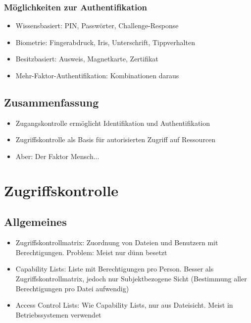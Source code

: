 \subsubsection{Möglichkeiten zur Authentifikation}
\begin{itemize}
	\item Wissensbasiert: PIN, Passwörter, Challenge-Response
	\item Biometrie: Fingerabdruck, Iris, Unterschrift, Tippverhalten
	\item Besitzbasiert: Ausweis, Magnetkarte, Zertifikat
	\item Mehr-Faktor-Authentifikation: Kombinationen daraus
\end{itemize}


\subsection{Zusammenfassung}
\begin{itemize}
	\item Zugangskontrolle ermöglicht Identifikation und Authentifikation
	\item Zugriffskontrolle als Basis für autorisierten Zugriff auf Ressourcen
	\item Aber: Der Faktor Mensch...
\end{itemize}



\section{Zugriffskontrolle}

\subsection{Allgemeines}
\begin{itemize}
	\item Zugriffskontrollmatrix: Zuordnung von Dateien und Benutzern mit Berechtigungen. Problem: Meist nur dünn besetzt
	\item Capability Lists: Liste mit Berechtigungen pro Person. Besser als Zugriffskontrollmatrix, jedoch nur Subjektbezogene Sicht (Bestimmung aller Berechtigungen pro Datei aufwendig)
	\item Access Control Lists: Wie Capability Lists, nur aus Dateisicht. Meist in Betriebssystemen verwendet
\end{itemize}


